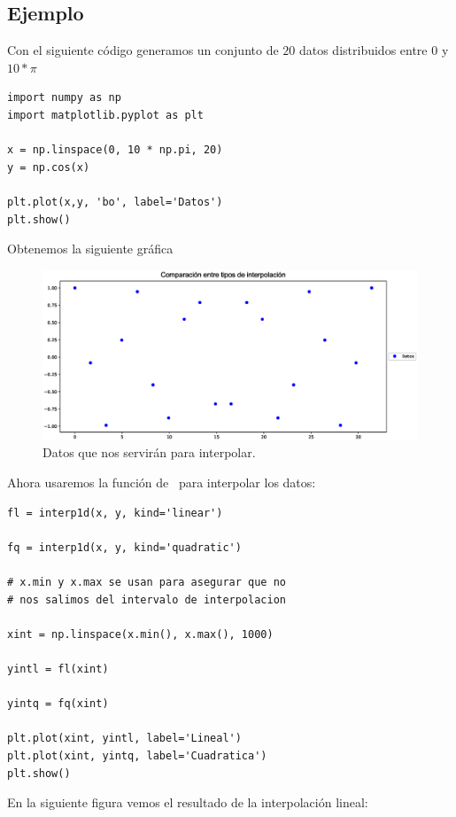 \subsection*{Ejemplo}
Con el siguiente código generamos un conjunto de $20$ datos distribuidos entre $0$ y $10 * \pi$
\begin{lstlisting}[caption=Puntos conocidos, basicstyle=\ttfamily\large, columns=fullflexible]
import numpy as np
import matplotlib.pyplot as plt

x = np.linspace(0, 10 * np.pi, 20)
y = np.cos(x)

plt.plot(x,y, 'bo', label='Datos')
plt.show()
\end{lstlisting}
Obtenemos la siguiente gráfica
\begin{figure}[H]
\centering
\hspace*{-0.2cm}\includegraphics[scale=0.5]{Imagenes/interpolacion_01.eps}
\caption{Datos que nos servirán para interpolar.}
\end{figure}
\newpage
Ahora usaremos la función de \python\ para interpolar los datos:
\begin{lstlisting}[caption=Inteporlando con la función \funcionazul{interp1d}, basicstyle=\ttfamily\large, columns=fullflexible]
fl = interp1d(x, y, kind='linear')

fq = interp1d(x, y, kind='quadratic')

# x.min y x.max se usan para asegurar que no
# nos salimos del intervalo de interpolacion

xint = np.linspace(x.min(), x.max(), 1000)

yintl = fl(xint)

yintq = fq(xint)

plt.plot(xint, yintl, label='Lineal')
plt.plot(xint, yintq, label='Cuadratica')
plt.show()
\end{lstlisting}
En la siguiente figura vemos el resultado de la interpolación lineal:
